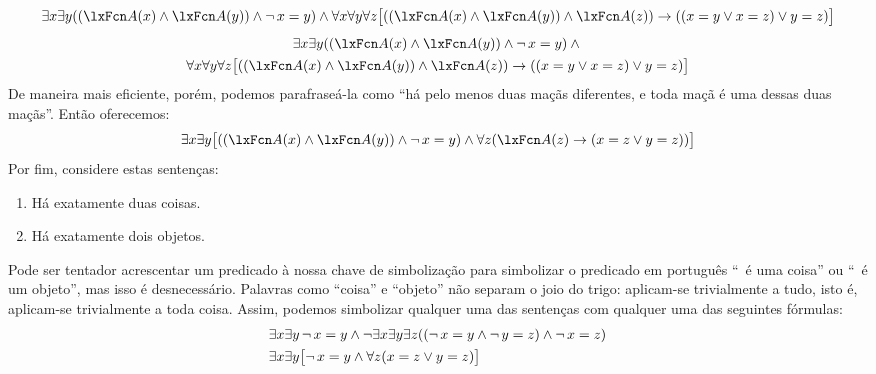 \ifHTMLtarget
\[\exists x \exists y((\atom{A}{x} \eand \atom{A}{y}) \eand \enot\, {x = y}) \eand
\forall x\forall y\forall z\bigl[((\atom{A}{x} \eand \atom{A}{y})
\eand \atom{A}{z}) \eif ((x=y \eor x=z) \eor y=z)\bigr]
\]
\else
\begin{multline*}
  \exists x \exists y((\atom{A}{x} \eand \atom{A}{y}) \eand \enot\, {x = y}) \eand {}\\
  \forall x\forall y\forall z\bigl[((\atom{A}{x} \eand \atom{A}{y}) \eand \atom{A}{z}) \eif ((x=y \eor x=z) \eor y=z)\bigr]
\end{multline*}
\fi
De maneira mais eficiente, porém, podemos parafraseá-la como \textquotedblleft há pelo menos duas maçãs diferentes, e toda maçã é uma dessas duas maçãs\textquotedblright{}. Então oferecemos:
$$\exists x\exists y\bigl[((\atom{A}{x} \eand \atom{A}{y}) \eand \enot\, {x = y}) \eand \forall z(\atom{A}{z} \eif ( x= z \eor y = z))\bigr]$$
Por fim, considere estas sentenças:
\begin{enumerate}
\item\label{exactly2things} Há exatamente duas coisas.
\item\label{exactly2objects} Há exatamente dois objetos.
\end{enumerate}
Pode ser tentador acrescentar um predicado à nossa chave de simbolização para simbolizar o predicado em português \textquotedblleft \blank\ é uma coisa\textquotedblright{} ou \textquotedblleft \blank\ é um objeto\textquotedblright{}, mas isso é desnecessário. Palavras como \textquotedblleft coisa\textquotedblright{} e \textquotedblleft objeto\textquotedblright{} não separam o joio do trigo: aplicam-se trivialmente a tudo, isto é, aplicam-se trivialmente a toda coisa. Assim, podemos simbolizar qualquer uma das sentenças com qualquer uma das seguintes fórmulas:
\begin{align*}
	& \exists x \exists y\,\neg\, {x = y} \wedge  \neg \exists x \exists y \exists z ((\neg\, {x = y} \wedge \neg\, {y = z}) \wedge \neg\, {x = z}) \\
	& \exists x \exists y \bigl[\neg\, {x = y} \wedge \forall z(x=z \vee y = z)\bigr]
\end{align*}

\practiceproblems

